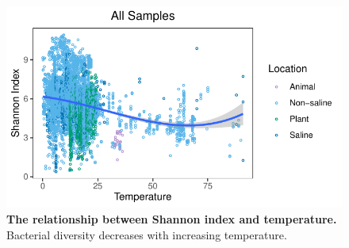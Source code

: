 \begin{figure}[H]
    \centering
    \includegraphics[scale=0.9]{./Figures/Shan_T_all}
    \caption{\textbf{The relationship between Shannon index and temperature.} Bacterial diversity decreases with increasing temperature.}
    \label{fig:Shan_T}
\end{figure}

